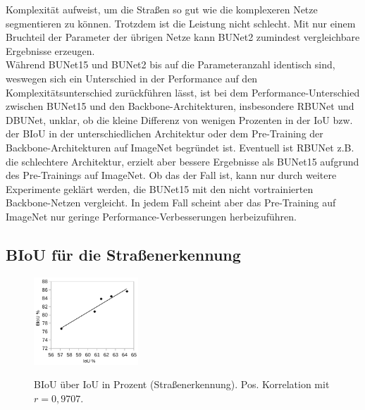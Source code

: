 Komplexität aufweist, um die Straßen so gut wie die komplexeren Netze segmentieren zu können. 
Trotzdem ist die Leistung nicht schlecht. Mit nur einem Bruchteil der Parameter der übrigen Netze
kann BUNet2 zumindest vergleichbare Ergebnisse erzeugen. \\
Während BUNet15 und BUNet2 bis auf die Parameteranzahl identisch sind, weswegen sich ein Unterschied in der 
Performance auf den Komplexitätsunterschied zurückführen lässt, ist bei dem Performance-Unterschied 
zwischen BUNet15 und den Backbone-Architekturen, insbesondere RBUNet und DBUNet, unklar, ob die kleine 
Differenz von wenigen Prozenten in der IoU bzw. der BIoU in der unterschiedlichen Architektur oder dem 
Pre-Training der Backbone-Architekturen auf ImageNet begründet ist. Eventuell ist RBUNet z.B. die schlechtere 
Architektur, erzielt aber bessere Ergebnisse als BUNet15 aufgrund des Pre-Trainings auf ImageNet. 
Ob das der Fall ist, kann nur durch weitere Experimente geklärt werden, die BUNet15 mit den nicht vortrainierten 
Backbone-Netzen vergleicht. In jedem Fall scheint aber das Pre-Training auf ImageNet nur geringe 
Performance-Verbesserungen herbeizuführen. 

\subsection{BIoU für die Straßenerkennung}

\begin{figure}
	\centering
	\vspace{-20pt} %
	\includegraphics[width=0.35\textwidth]{Bilder/iou-biou-correlation.pdf}
	\vspace{-5pt}
	\caption[BIoU der Modelle der Straßenerkennung aufgetragen über deren IoU.]{\unskip}
	BIoU über IoU in Prozent (Straßenerkennung). Pos. Korrelation mit $r = 0,9707$. 
	\label{fig:iou-biou-corr}
\end{figure}

